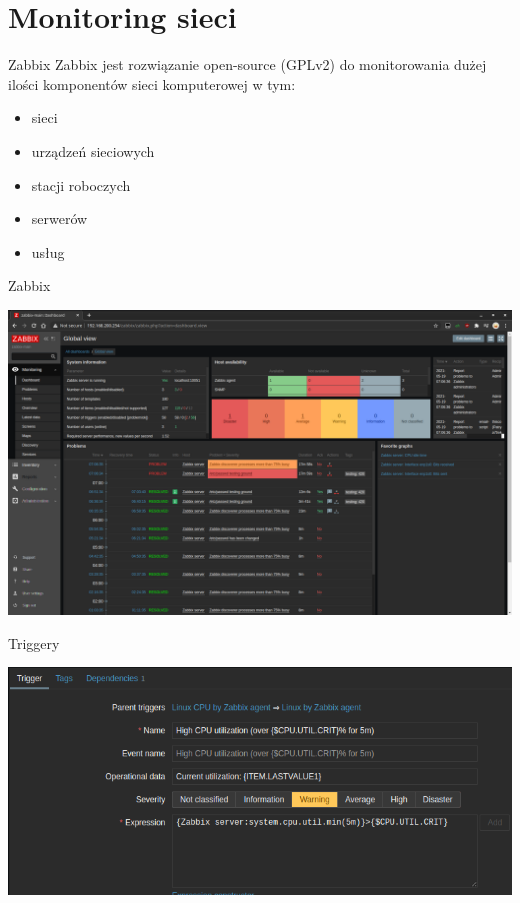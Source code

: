 \documentclass[presentation]{beamer}
\begin{document}
\section{Monitoring sieci}
\label{sec:orgbc1e0cc}
\begin{frame}[label={sec:org6b55831}]{Zabbix}
Zabbix jest rozwiązanie open-source (GPLv2) do monitorowania dużej ilości komponentów sieci komputerowej w tym:
\begin{itemize}
\item sieci
\item urządzeń sieciowych
\item stacji roboczych
\item serwerów
\item usług
\end{itemize}
\end{frame}
\begin{frame}[label={sec:orge51c02e}]{Zabbix}
\begin{center}
\includegraphics[width=.9\linewidth]{./data/zabbix/homepage.png}
\end{center}
\end{frame}
\begin{frame}[label={sec:orgc29a225}]{Triggery}
\begin{center}
\includegraphics[width=.9\linewidth]{./data/zabbix/trigger2.png}
\end{center}
\end{frame}
\end{document}
